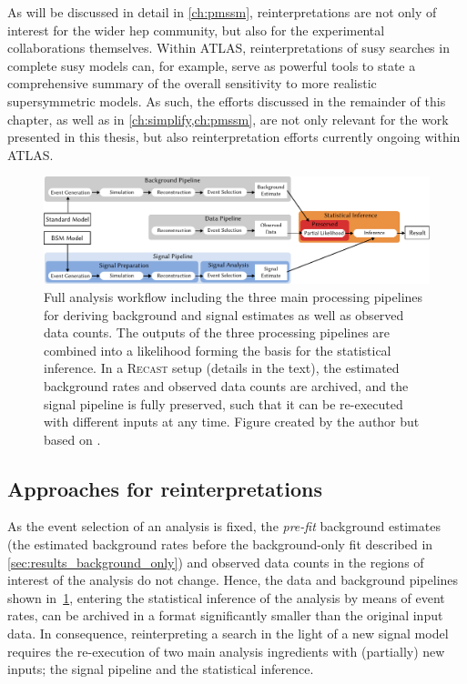 As will be discussed in detail in \cref{ch:pmssm}, reinterpretations are not only of interest for the wider \gls{hep} community, but also for the experimental collaborations themselves. Within ATLAS, reinterpretations of \gls{susy} searches in complete \gls{susy} models can, for example, serve as powerful tools to state a comprehensive summary of the overall sensitivity to more realistic supersymmetric models. As such, the efforts discussed in the remainder of this chapter, as well as in \cref{ch:simplify,ch:pmssm}, are not only relevant for the work presented in this thesis, but also reinterpretation efforts currently ongoing within ATLAS.
 
 \begin{figure}
	\centering\includegraphics[width=\textwidth]{pipeline}
	\caption{Full analysis workflow including the three main processing pipelines for deriving background and signal estimates as well as observed data counts. The outputs of the three processing pipelines are combined into a likelihood forming the basis for the statistical inference. In a \textsc{Recast} setup (details in the text), the estimated background rates and observed data counts are archived, and the signal pipeline is fully preserved, such that it can be re-executed with different inputs at any time. Figure created by the author but based on \mbox{\cite{ATL-PHYS-PUB-2019-032}}.}
	\label{fig:pipeline_analysis}
\end{figure}

\subsection{Approaches for reinterpretations}


As the event selection of an analysis is fixed, the \textit{pre-fit} background estimates (\ie the estimated background rates before the background-only fit described in \cref{sec:results_background_only}) and observed data counts in the regions of interest of the analysis do not change.
Hence, the data and background pipelines shown in~\cref{fig:pipeline_analysis}, entering the statistical inference of the analysis by means of event rates, can be archived in a format significantly smaller than the original input data.
In consequence, reinterpreting a search in the light of a new signal model requires the re-execution of two main analysis ingredients with (partially) new inputs; the signal pipeline and the statistical inference.

